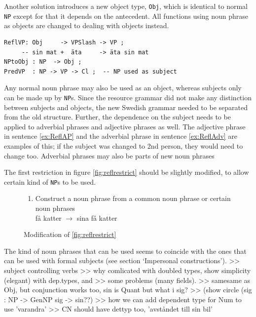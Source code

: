 \documentclass{report}
\begin{document}
Another solution introduces a new object type, \verb_Obj_, which is
identical to normal \verb_NP_ except for that it depends on 
the antecedent. All functions using noun phrase as objects are changed to dealing
with objects instead.
\begin{verbatim}
ReflVP: Obj     -> VPSlash -> VP ;
     -- sin mat +  äta     -> äta sin mat 
NPtoObj : NP  -> Obj ;
PredVP  : NP -> VP -> Cl ;  -- NP used as subject
\end{verbatim}
Any normal noun phrase may also be used as an object, whereas subjects only
can be made up by \verb-NP-s.
Since the resource grammar did not make any distinction between
subjects and objects, the new Swedish grammar needed to be separated from the old
structure. 
Further, the dependence on the subject needs to be applied to adverbial phrases and
adjective phrases as well. The adjective phrase in sentence \ref{ex:ReflAP} and
the adverbial phrase in sentence \ref{ex:ReflAdv} are examples of this; if the
subject was changed to 2nd person, they  would need to change too.
 \label{ex:ReflAP2}
\vspace{-2mm}
 \label{ex:ReflAdv2}
Adverbial phrases may also be parts of new noun phrases

The first restriction in figure \ref{fig:reflrestrict} should be slightly
modified, to allow certain kind of \verb|NP|s to be used.
\begin{figure}[h]
\begin{enumerate}
\item{
Construct a noun phrase from a common noun phrase or certain noun phrases \\
få katter $\rightarrow$ sina få katter} 
\end{enumerate}
\caption{Modification of \ref{fig:reflrestrict}}
\end{figure}

The kind of noun phrases that can be used seems to coincide with the ones
that can be used with formal subjects (see section `Impersonal constructions').
>> subject controlling verbs
>> why comlicated with doubled types, show simplicity (elegant) with dep.types, and
>> some problems (many fields).
>> samesame as Obj, but conjunction works too, sin is Quant but what i sig?
>> (show circle (sig : NP -> GenNP sig -> sin??)
>> how we can add dependent type for Num to use 'varandra'
>> CN should have dettyp too, 'avståndet till sin bil'
\end{document}
